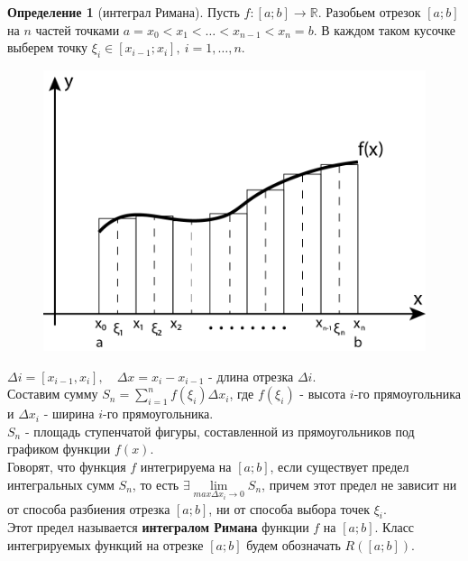 \documentclass{report}
\theoremstyle{definition}
\newtheorem*{definition}{Определение}
\begin{document}
\begin{definition}[интеграл Римана]
    Пусть $f:[a;b]\rightarrow\mathbb{R}$. Разобьем отрезок $[a;b]$ на $n$ частей точками $a = x_{0} < x_{1} < \ldots <
        x_{n-1} < x_{n} = b$. В каждом таком кусочке выберем точку $\xi_{i} \in [x_{i-1};x_{i}], \ i = 1,\ldots ,n$.\\

    \begin{figure}[H]
        \begin{center}
            \includegraphics[scale=0.7]{graph1.png}\label{figure1}
        \end{center}
    \end{figure}

    $\Delta i = [x_{i-1}, x_{i}], \quad \Delta x = x_{i} - x_{i-1}$ - длина отрезка $\Delta i$.\\

    Составим сумму $S_{n} = \sum_{i=1}^{n} f(\xi_{i})\Delta x_{i}$, где $f(\xi_{i})$ - высота $i$-го прямоугольника и
    $\Delta x_{i}$ - ширина $i$-го прямоугольника.\\

    $S_{n}$ - площадь ступенчатой фигуры, составленной из прямоугольников под графиком функции $f(x)$.\\

    Говорят, что функция $f$ интегрируема на $[a;b]$, если существует предел интегральных сумм $S_{n}$, то есть
    $\exists \underset{max\Delta x_{i}\rightarrow0}{\lim}S_{n}$, причем этот предел не зависит ни от способа разбиения
    отрезка $[a;b]$, ни от способа выбора точек $\xi_{i}$.\\

    Этот предел называется \textbf{интегралом Римана} функции $f$ на $[a;b]$. Класс интегрируемых функций на отрезке
    $[a;b]$ будем обозначать $R([a;b])$.
\end{definition}
\end{document}

